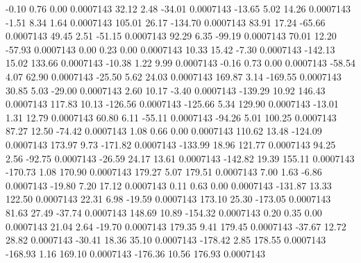        -0.10        0.76        0.00     0.0007143
       32.12        2.48      -34.01     0.0007143
      -13.65        5.02       14.26     0.0007143
       -1.51        8.34        1.64     0.0007143
      105.01       26.17     -134.70     0.0007143
       83.91       17.24      -65.66     0.0007143
       49.45        2.51      -51.15     0.0007143
       92.29        6.35      -99.19     0.0007143
       70.01       12.20      -57.93     0.0007143
        0.00        0.23        0.00     0.0007143
       10.33       15.42       -7.30     0.0007143
     -142.13       15.02      133.66     0.0007143
      -10.38        1.22        9.99     0.0007143
       -0.16        0.73        0.00     0.0007143
      -58.54        4.07       62.90     0.0007143
      -25.50        5.62       24.03     0.0007143
      169.87        3.14     -169.55     0.0007143
       30.85        5.03      -29.00     0.0007143
        2.60       10.17       -3.40     0.0007143
     -139.29       10.92      146.43     0.0007143
      117.83       10.13     -126.56     0.0007143
     -125.66        5.34      129.90     0.0007143
      -13.01        1.31       12.79     0.0007143
       60.80        6.11      -55.11     0.0007143
      -94.26        5.01      100.25     0.0007143
       87.27       12.50      -74.42     0.0007143
        1.08        0.66        0.00     0.0007143
      110.62       13.48     -124.09     0.0007143
      173.97        9.73     -171.82     0.0007143
     -133.99       18.96      121.77     0.0007143
       94.25        2.56      -92.75     0.0007143
      -26.59       24.17       13.61     0.0007143
     -142.82       19.39      155.11     0.0007143
     -170.73        1.08      170.90     0.0007143
      179.27        5.07      179.51     0.0007143
        7.00        1.63       -6.86     0.0007143
      -19.80        7.20       17.12     0.0007143
        0.11        0.63        0.00     0.0007143
     -131.87       13.33      122.50     0.0007143
       22.31        6.98      -19.59     0.0007143
      173.10       25.30     -173.05     0.0007143
       81.63       27.49      -37.74     0.0007143
      148.69       10.89     -154.32     0.0007143
        0.20        0.35        0.00     0.0007143
       21.04        2.64      -19.70     0.0007143
      179.35        9.41      179.45     0.0007143
      -37.67       12.72       28.82     0.0007143
      -30.41       18.36       35.10     0.0007143
     -178.42        2.85      178.55     0.0007143
     -168.93        1.16      169.10     0.0007143
     -176.36       10.56      176.93     0.0007143
